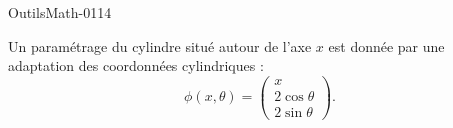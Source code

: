 
\begin{corrige}{OutilsMath-0114}

    Un paramétrage du cylindre situé autour de l'axe $x$ est donnée par une adaptation des coordonnées cylindriques :
    \begin{equation}
        \phi(x,\theta)=\begin{pmatrix}
            x    \\ 
            2\cos\theta    \\ 
            2\sin\theta    
        \end{pmatrix}.
    \end{equation}
    

\end{corrige}

